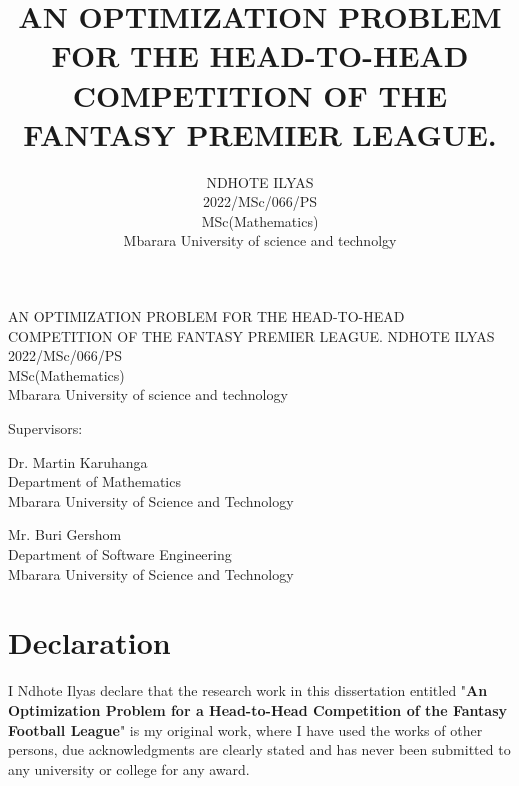 \documentclass[12pt,oneside,a4paper]{book}
\date{}
\theoremstyle{definition}
\theoremstyle{remark}
\begin{document}
	\begin{titlepage}
		\thispagestyle{empty}
		\title{AN OPTIMIZATION PROBLEM FOR THE HEAD-TO-HEAD COMPETITION OF THE FANTASY PREMIER LEAGUE. }
		\author{NDHOTE ILYAS \\2022/MSc/066/PS \\MSc(Mathematics)\\Mbarara University of science and technolgy }



		\begin{center}
			\vspace*{1cm}
			\Huge AN OPTIMIZATION PROBLEM FOR THE HEAD-TO-HEAD COMPETITION OF THE FANTASY PREMIER LEAGUE.
			\vfill
			\large{NDHOTE ILYAS \\2022/MSc/066/PS \\MSc(Mathematics)\\Mbarara University of science and technology }

			\vfill

			\begin{center}
				\large{Supervisors:}
			\end{center}

			\begin{center}
				\large{Dr. Martin Karuhanga}\\
				Department of Mathematics\\
				Mbarara University of Science and Technology
			\end{center}
			\begin{center}
				\large Mr. Buri Gershom\\
				Department of Software Engineering\\
				Mbarara University of Science and Technology
			\end{center}

		\end{center}

	\end{titlepage}

	\newpage
	\newpage
	\section*{Declaration}
		I Ndhote Ilyas declare that the research work in this dissertation entitled "\textbf{An Optimization Problem for a Head-to-Head Competition of the Fantasy Football League}" is my original work, where I have used the works of other persons, due acknowledgments are clearly stated and has never been submitted to any university or college for any award.\\
\end{document}
